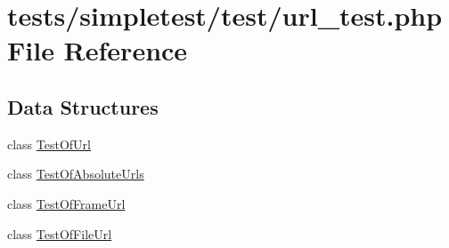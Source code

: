 \hypertarget{url__test_8php}{\section{tests/simpletest/test/url\-\_\-test.php File Reference}
\label{url__test_8php}
}
\subsection*{Data Structures}
\begin{DoxyCompactItemize}
\item 
class \hyperlink{class_test_of_url}{Test\-Of\-Url}
\item 
class \hyperlink{class_test_of_absolute_urls}{Test\-Of\-Absolute\-Urls}
\item 
class \hyperlink{class_test_of_frame_url}{Test\-Of\-Frame\-Url}
\item 
class \hyperlink{class_test_of_file_url}{Test\-Of\-File\-Url}
\end{DoxyCompactItemize}
